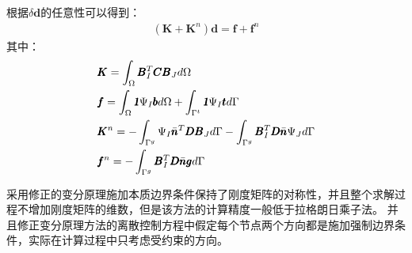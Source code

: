 根据$\delta\pmb{d}$的任意性可以得到：
\begin{equation}
\begin{split}
    (\pmb{K}+\pmb{K}^n)\pmb{d}=\pmb{f}+\pmb{f}^n
\end{split}
\end{equation}
其中：
\begin{equation}
\begin{split}
&\pmb K=\int_{\Omega}\pmb{B}_I^T\pmb{C}\pmb{B}_Jd\Omega\\
&\pmb f=\int_{\Omega}\pmb{\textsl{1}}\Psi_I\pmb{b}d\Omega+\int_{\Gamma^t}\pmb{\textsl{1}}\Psi_I\pmb{t}d\Gamma\\
&\pmb K^n=-\int_{\Gamma^g}\Psi_I\bar{\pmb{n}}^T\pmb{D}\pmb{B}_Jd\Gamma-\int_{\Gamma^g}\pmb{B}_I^T\pmb{D}\bar{\pmb{n}}\Psi_Jd\Gamma\\
&\pmb f^n=-\int_{\Gamma^g}\pmb{B}_I^T\pmb{D}\bar{\pmb{n}}\pmb{g}d\Gamma
\end{split}
\end{equation}\par
采用修正的变分原理施加本质边界条件保持了刚度矩阵的对称性，并且整个求解过程不增加刚度矩阵的维数，但是该方法的计算精度一般低于拉格朗日乘子法。
并且修正变分原理方法的离散控制方程中假定每个节点两个方向都是施加强制边界条件，实际在计算过程中只考虑受约束的方向。
